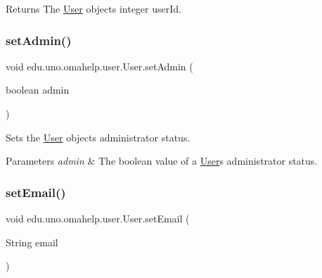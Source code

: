 \begin{DoxyReturn}{Returns}
The \mbox{\hyperlink{classedu_1_1uno_1_1omahelp_1_1user_1_1_user}{User}} object\textquotesingle{}s integer user\+Id. 
\end{DoxyReturn}
\mbox{\label{classedu_1_1uno_1_1omahelp_1_1user_1_1_user_a736da37e28c9a538ac0ce74f44328d96}} 
\subsubsection{\texorpdfstring{set\+Admin()}{setAdmin()}}
{\footnotesize\ttfamily void edu.\+uno.\+omahelp.\+user.\+User.\+set\+Admin (\begin{DoxyParamCaption}\item[{boolean}]{admin }\end{DoxyParamCaption})}

Sets the \mbox{\hyperlink{classedu_1_1uno_1_1omahelp_1_1user_1_1_user}{User}} object\textquotesingle{}s administrator status.


\begin{DoxyParams}{Parameters}
{\em admin} & The boolean value of a \mbox{\hyperlink{classedu_1_1uno_1_1omahelp_1_1user_1_1_user}{User}}\textquotesingle{}s administrator status. \\
\hline
\end{DoxyParams}
\mbox{\label{classedu_1_1uno_1_1omahelp_1_1user_1_1_user_a513f3606c2a7313df9e04dce2b9b6a9b}} 
\subsubsection{\texorpdfstring{set\+Email()}{setEmail()}}
{\footnotesize\ttfamily void edu.\+uno.\+omahelp.\+user.\+User.\+set\+Email (\begin{DoxyParamCaption}\item[{String}]{email }\end{DoxyParamCaption})}

